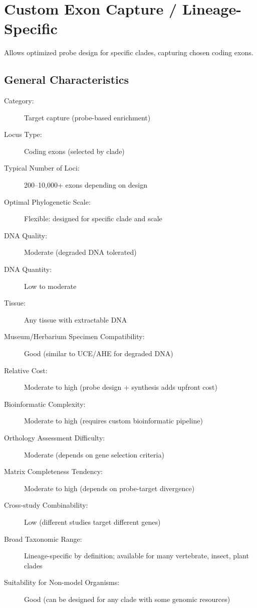 \textcite{johnson2019, baker2021a, baker2021b, zuntini2024}

\section{Custom Exon Capture / Lineage-Specific}

Allows optimized probe design for specific clades, capturing chosen coding exons.

\subsection{General Characteristics}

\begin{description}
\item[Category:] Target capture (probe-based enrichment)
\item[Locus Type:] Coding exons (selected by clade)
\item[Typical Number of Loci:] 200--10,000+ exons depending on design
\item[Optimal Phylogenetic Scale:] Flexible: designed for specific clade and scale
\item[DNA Quality:] Moderate (degraded DNA tolerated)
\item[DNA Quantity:] Low to moderate
\item[Tissue:] Any tissue with extractable DNA
\item[Museum/Herbarium Specimen Compatibility:] Good (similar to UCE/AHE for degraded DNA)
\item[Relative Cost:] Moderate to high (probe design + synthesis adds upfront cost)
\item[Bioinformatic Complexity:] Moderate to high (requires custom bioinformatic pipeline)
\item[Orthology Assessment Difficulty:] Moderate (depends on gene selection criteria)
\item[Matrix Completeness Tendency:] Moderate to high (depends on probe-target divergence)
\item[Cross-study Combinability:] Low (different studies target different genes)
\item[Broad Taxonomic Range:] Lineage-specific by definition; available for many vertebrate, insect, plant clades
\item[Suitability for Non-model Organisms:] Good (can be designed for any clade with some genomic resources)
\end{description}

